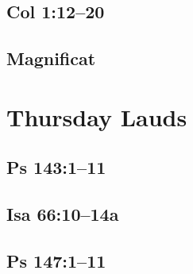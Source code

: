 {%
\parindent 0pt
\noindent
\ifx\preLilyPondExample \undefined
\else
  \expandafter\preLilyPondExample
\fi
\def\lilypondbook{}%

\ifx\postLilyPondExample \undefined
\else
  \expandafter\postLilyPondExample
\fi
}

\subsection{Col 1:12--20}

{%
\parindent 0pt
\noindent
\ifx\preLilyPondExample \undefined
\else
  \expandafter\preLilyPondExample
\fi
\def\lilypondbook{}%

\ifx\postLilyPondExample \undefined
\else
  \expandafter\postLilyPondExample
\fi
}

\subsection{Magnificat}

{%
\parindent 0pt
\noindent
\ifx\preLilyPondExample \undefined
\else
  \expandafter\preLilyPondExample
\fi
\def\lilypondbook{}%

\ifx\postLilyPondExample \undefined
\else
  \expandafter\postLilyPondExample
\fi
}


\section{Thursday Lauds}

\subsection{Ps 143:1--11}

{%
\parindent 0pt
\noindent
\ifx\preLilyPondExample \undefined
\else
  \expandafter\preLilyPondExample
\fi
\def\lilypondbook{}%

\ifx\postLilyPondExample \undefined
\else
  \expandafter\postLilyPondExample
\fi
}

\subsection{Isa 66:10--14a}

{%
\parindent 0pt
\noindent
\ifx\preLilyPondExample \undefined
\else
  \expandafter\preLilyPondExample
\fi
\def\lilypondbook{}%

\ifx\postLilyPondExample \undefined
\else
  \expandafter\postLilyPondExample
\fi
}

\subsection{Ps 147:1--11}

